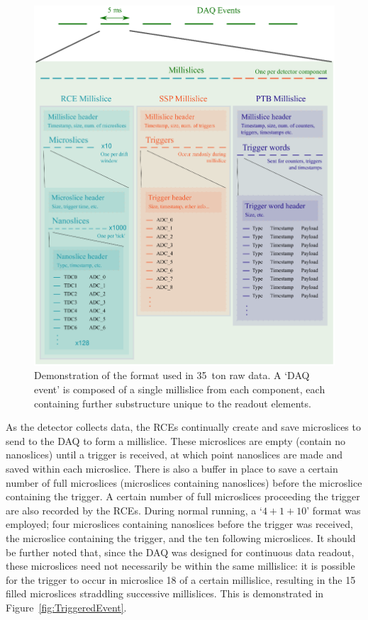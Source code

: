 \begin{figure}[p]
  \centering
  \includegraphics[width=14cm]{data_format.eps}
  \caption[35~ton data format]{Demonstration of the format used in 35~ton raw data.  A `DAQ event' is composed of a single millislice from each component, each containing further substructure unique to the readout elements.}
  \label{fig:DataFormat}
\end{figure}

As the detector collects data, the RCEs continually create and save microslices to send to the DAQ to form a millislice.  These microslices are empty (contain no nanoslices) until a trigger is received, at which point nanoslices are made and saved within each microslice.  There is also a buffer in place to save a certain number of full microslices (microslices containing nanoslices) before the microslice containing the trigger.  A certain number of full microslices proceeding the trigger are also recorded by the RCEs.  During normal running, a `$4+1+10$' format was employed; four microslices containing nanoslices before the trigger was received, the microslice containing the trigger, and the ten following microslices.  It should be further noted that, since the DAQ was designed for continuous data readout, these microslices need not necessarily be within the same millislice: it is possible for the trigger to occur in microslice 18 of a certain millislice, resulting in the 15 filled microslices straddling successive millislices.  This is demonstrated in Figure~\ref{fig:TriggeredEvent}.

